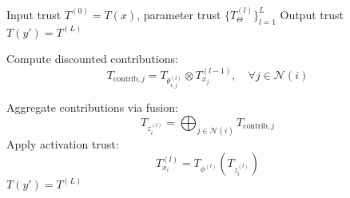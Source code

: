 


\begin{algorithm}
\caption{Trust Feedforward}
\begin{algorithmic}[1]
\Require Input trust $T^{(0)} = T(x)$, parameter trust 
         $\{T^{(l)}_\Theta\}_{l=1}^{L}$
\Ensure Output trust $T(y') = T^{(L)}$

        \State Compute discounted contributions:
        \[
        T_{\text{contrib},j} = T_{\theta^{(l)}_{i,j}} \otimes T^{(l-1)}_{x_j}, 
        \quad \forall j \in \mathcal{N}(i)
        \]

        \State Aggregate contributions via fusion:
        \[
        T_{z^{(l)}_i} = \bigoplus_{j \in \mathcal{N}(i)} T_{\text{contrib},j}
        \]
        \State Apply activation trust:
        \[
        T^{(l)}_{x_i} = T_{\phi^{(l)}}(T_{z^{(l)}_i})
        \]
    \EndFor
\EndFor
\State \Return $T(y') = T^{(L)}$
\end{algorithmic}
\label{alg:trustff}
\end{algorithm}

